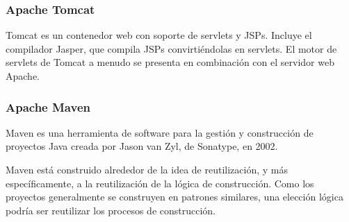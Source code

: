 \subsubsection{Apache Tomcat}

Tomcat es un contenedor web con soporte de servlets y JSPs. Incluye el compilador Jasper, que compila JSPs convirtiéndolas en servlets. El motor de servlets de Tomcat a menudo se presenta en combinación con el servidor web Apache.

\subsubsection{Apache Maven}

Maven es una herramienta de software para la gestión y construcción de proyectos Java creada por Jason van Zyl, de Sonatype, en 2002. 

Maven está construido alrededor de la idea de reutilización, y más específicamente, a la reutilización de la lógica de construcción. Como los proyectos generalmente se construyen en patrones similares, una elección lógica podría ser reutilizar los procesos de construcción.